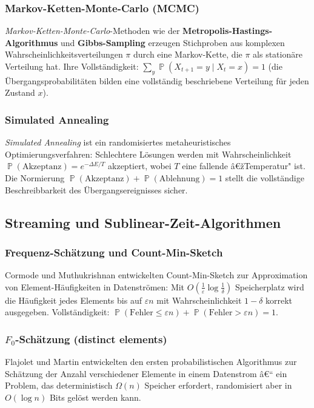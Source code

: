 ﻿\documentclass[12pt,a4paper]{article}
\theoremstyle{definition}
\theoremstyle{plain}
\theoremstyle{remark}
\DeclareMathOperator{\Prob}{\mathbb{P}}
\begin{document}
\subsubsection{Markov-Ketten-Monte-Carlo (MCMC)}
\emph{Markov-Ketten-Monte-Carlo}-Methoden wie der \textbf{Metropolis-Hastings-Algorithmus}
\cite{metropolis1953equation, hastings1970monte} und
\textbf{Gibbs-Sampling} erzeugen Stichproben aus komplexen
Wahrscheinlichkeitsverteilungen $\pi$ durch eine Markov-Kette, die $\pi$ als
stationäre Verteilung hat. Ihre Vollständigkeit:
$\sum_y \Prob(X_{t+1}=y \mid X_t=x) = 1$ (die Übergangsprobabilitäten bilden
eine vollständig beschriebene Verteilung für jeden Zustand $x$).

\subsubsection{Simulated Annealing}
\emph{Simulated Annealing} \cite{kirkpatrick1983optimization} ist ein
randomisiertes metaheuristisches Optimierungsverfahren: Schlechtere
Lösungen werden mit Wahrscheinlichkeit
$\Prob(\text{Akzeptanz}) = e^{-\Delta E / T}$
akzeptiert, wobei $T$ eine fallende â€žTemperatur" ist. Die Normierung
$\Prob(\text{Akzeptanz}) + \Prob(\text{Ablehnung}) = 1$ stellt die
vollständige Beschreibbarkeit des Übergangsereignisses sicher.

\subsection{Streaming und Sublinear-Zeit-Algorithmen}

\subsubsection{Frequenz-Schätzung und Count-Min-Sketch}
Cormode und Muthukrishnan \cite{cormode2005improved} entwickelten
Count-Min-Sketch zur Approximation von Element-Häufigkeiten in Datenströmen:
Mit $O(\frac{1}{\varepsilon} \log \frac{1}{\delta})$ Speicherplatz wird die
Häufigkeit jedes Elements bis auf $\varepsilon n$ mit Wahrscheinlichkeit
$1-\delta$ korrekt ausgegeben. Vollständigkeit:
$\Prob(\text{Fehler} \leq \varepsilon n) + \Prob(\text{Fehler} > \varepsilon n)= 1$.

\subsubsection{$F_0$-Schätzung (distinct elements)}
Flajolet und Martin \cite{flajolet1985probabilistic} entwickelten den ersten
probabilistischen Algorithmus zur Schätzung der Anzahl verschiedener Elemente
in einem Datenstrom â€“ ein Problem, das deterministisch $\Omega(n)$ Speicher
erfordert, randomisiert aber in $O(\log n)$ Bits gelöst werden kann.
\end{document}
